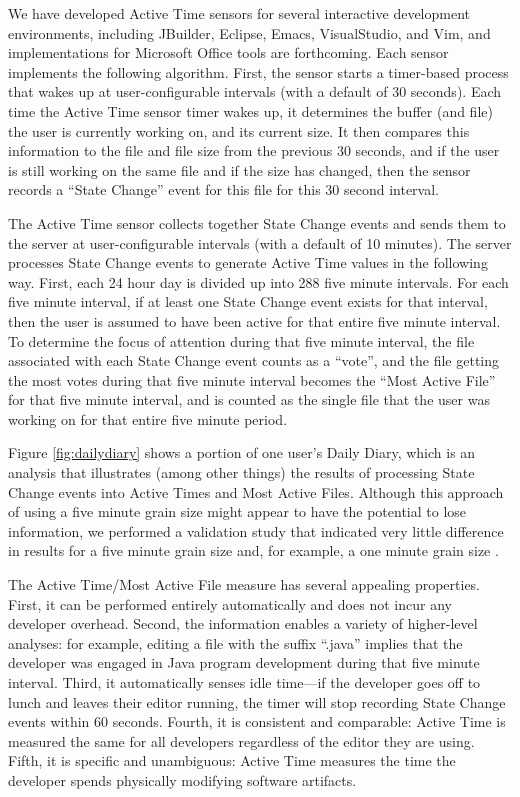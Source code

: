 \documentclass[10pt,twocolumn]{article}
\begin{document}
We have developed Active Time sensors for several interactive development
environments, including JBuilder, Eclipse, Emacs, VisualStudio, and Vim,
and implementations for Microsoft Office tools are forthcoming.
Each sensor implements the following algorithm. First, the sensor
starts a timer-based process that wakes up at user-configurable intervals
(with a default of 30 seconds). Each time the Active Time sensor timer
wakes up, it determines the buffer (and file) the user is currently working
on, and its current size.  It then compares this information to the file
and file size from the previous 30 seconds, and if the user is still
working on the same file and if the size has changed, then the sensor
records a ``State Change'' event for this file for this 30 second interval.

The Active Time sensor collects together State Change events and sends them
to the server at user-configurable intervals (with a default of 10
minutes).  The server processes State Change events to generate 
Active Time values in the following way. First, each 24 hour day is divided up
into 288 five minute intervals. For each five minute interval, if at least
one State Change event exists for that interval, then the user is assumed
to have been active for that entire five minute interval.  To determine the
focus of attention during that five minute interval, the file associated
with each State Change event counts as a ``vote'', and the file getting the
most votes during that five minute interval becomes the ``Most Active
File'' for that five minute interval, and is counted as the single file
that the user was working on for that entire five minute period.

Figure \ref{fig:dailydiary} shows a portion of one user's Daily Diary,
which is an analysis that illustrates (among other things) the results of
processing State Change events into Active Times and Most Active Files.
Although this approach of using a five minute grain size might appear to
have the potential to lose information, we performed a validation study
that indicated very little difference in results for a five minute grain
size and, for example, a one minute grain size \cite{csdl2-02-09}.

The Active Time/Most Active File measure has several appealing properties.
First, it can be performed entirely automatically and does not incur any
developer overhead. Second, the information enables a variety of
higher-level analyses: for example, editing a file with the suffix
``.java'' implies that the developer was engaged in Java program
development during that five minute interval.  Third, it automatically
senses idle time---if the developer goes off to lunch and leaves their
editor running, the timer will stop recording State Change events within 60
seconds. Fourth, it is consistent and comparable: Active Time is measured
the same for all developers regardless of the editor they are using.
Fifth, it is specific and unambiguous: Active Time measures the time the
developer spends physically modifying software artifacts.
\end{document}
